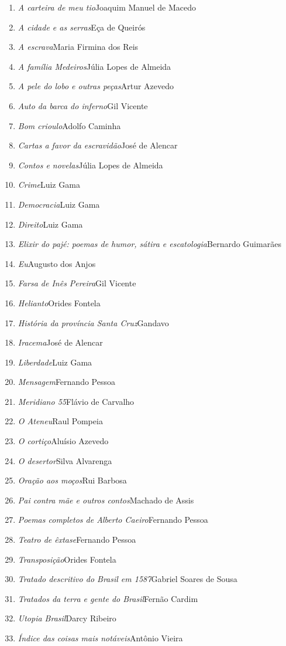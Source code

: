 \begin{enumerate}
\setlength\parskip{4.2pt}
\setlength\itemsep{-1.4mm}
\item \textit{A carteira de meu tio}\quad Joaquim Manuel de Macedo
\item \textit{A cidade e as serras}\quad Eça de Queirós
\item \textit{A escrava}\quad Maria Firmina dos Reis
\item \textit{A família Medeiros}\quad Júlia Lopes de Almeida 
\item \textit{A pele do lobo e outras peças}\quad Artur Azevedo
\item \textit{Auto da barca do inferno}\quad Gil Vicente
\item \textit{Bom crioulo}\quad Adolfo Caminha
\item \textit{Cartas a favor da escravidão}\quad José de Alencar
\item \textit{Contos e novelas}\quad Júlia Lopes de Almeida
\item \textit{Crime}\quad Luiz Gama
\item \textit{Democracia}\quad Luiz Gama
\item \textit{Direito}\quad Luiz Gama
\item \textit{Elixir do pajé: poemas de humor, sátira e escatologia}\quad Bernardo Guimarães
\item \textit{Eu}\quad Augusto dos Anjos
\item \textit{Farsa de Inês Pereira}\quad Gil Vicente
\item \textit{Helianto}\quad Orides Fontela
\item \textit{História da província Santa Cruz}\quad Gandavo
\item \textit{Iracema}\quad José de Alencar
\item \textit{Liberdade}\quad Luiz Gama
\item \textit{Mensagem}\quad Fernando Pessoa
\item \textit{Meridiano 55}\quad Flávio de Carvalho
\item \textit{O Ateneu}\quad Raul Pompeia
\item \textit{O cortiço}\quad Aluísio Azevedo
\item \textit{O desertor}\quad Silva Alvarenga
\item \textit{Oração aos moços}\quad Rui Barbosa
\item \textit{Pai contra mãe e outros contos}\quad Machado de Assis
\item \textit{Poemas completos de Alberto Caeiro}\quad Fernando Pessoa
\item \textit{Teatro de êxtase}\quad Fernando Pessoa
\item \textit{Transposição}\quad Orides Fontela
\item \textit{Tratado descritivo do Brasil em 1587}\quad Gabriel Soares de Sousa
\item \textit{Tratados da terra e gente do Brasil}\quad Fernão Cardim 
\item \textit{Utopia Brasil}\quad Darcy Ribeiro
\item \textit{Índice das coisas mais notáveis}\quad Antônio Vieira
\end{enumerate}

